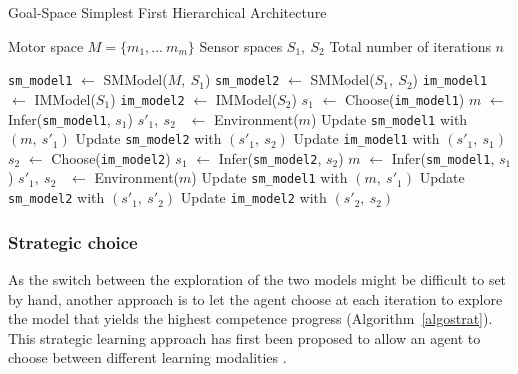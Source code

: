 \documentclass[12pt]{article}
\begin{document}
			\begin{algorithm}
				\caption{Goal-Space Simplest First Hierarchical Architecture}
				\label{algogsh}
				\begin{algorithmic}[1]
					\Require Motor space $M = \{m_1, ...~ m_m\}$
					\Require Sensor spaces $S_1,~S_2$
					\Require Total number of iterations $n$
					
					\State \texttt{sm\_model1} $\gets$ SMModel($M,~S_1$)
					\State \texttt{sm\_model2} $\gets$ SMModel($S_1,~S_2$)
					\State \texttt{im\_model1} $\gets$ IMModel($S_1$)
					\State \texttt{im\_model2} $\gets$ IMModel($S_2$)
						\State $s_1$ $\gets$ Choose(\texttt{im\_model1})
						\State $m$ $\gets$ Infer(\texttt{sm\_model1}, $s_1$)
						\State $s'_1,~s_2$~ $\gets$ Environment($m$)
						\State Update \texttt{sm\_model1} with $(m,~s'_1)$
						\State Update \texttt{sm\_model2} with $(s'_1,~s_2)$
						\State Update \texttt{im\_model1} with $(s'_1,~s_1)$
					\EndFor
						\State $s_2$ $\gets$ Choose(\texttt{im\_model2})
						\State $s_1$ $\gets$ Infer(\texttt{sm\_model2}, $s_2$)
						\State $m$ $\gets$ Infer(\texttt{sm\_model1}, $s_1$)
						\State $s'_1,~s_2$~ $\gets$ Environment($m$)
						\State Update \texttt{sm\_model1} with $(m,~s'_1)$
						\State Update \texttt{sm\_model2} with $(s'_1,~s'_2)$
						\State Update \texttt{im\_model2} with $(s'_2,~s_2)$
					\EndFor
				\end{algorithmic}
			\end{algorithm}
			
			
			
		\subsubsection{Strategic choice}
			
			As the switch between the exploration of the two models might be difficult to set by hand, 
			another approach is to let the agent choose at each iteration to explore the model that yields the highest competence progress 
			(Algorithm~\ref{algostrat}). 
			This strategic learning approach has first been proposed to allow an agent to choose between 
			different learning modalities \cite{nguyen2012}. 
			
\end{document}
